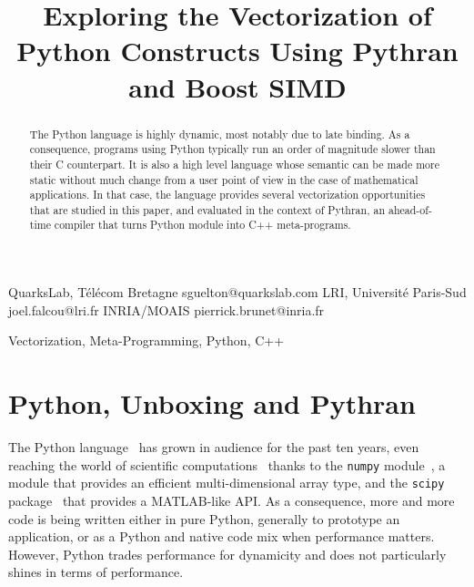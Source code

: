 \documentclass[preprint]{sigplanconf}
\begin{document}
\setlength{\pdfpageheight}{\paperheight}
\setlength{\pdfpagewidth}{\paperwidth}


\title{Exploring the Vectorization of Python Constructs Using Pythran and Boost SIMD}

           {QuarksLab, T{\'e}l{\'e}com Bretagne}
           {sguelton@quarkslab.com}
           {LRI, Universit\'e Paris-Sud}
           {joel.falcou@lri.fr}
           {INRIA/MOAIS}
           {pierrick.brunet@inria.fr}

\maketitle

\begin{abstract}

    The Python language is highly dynamic, most notably due to late binding. As
    a consequence, programs using Python typically run an order of magnitude
    slower than their C counterpart. It is also a high level language whose
    semantic can be made more static without much change from a user point of
    view in the case of mathematical applications. In that case, the language
    provides several vectorization opportunities that are studied in this
    paper, and evaluated in the context of Pythran, an ahead-of-time compiler
    that turns Python module into C++ meta-programs.

\end{abstract}



\keywords
Vectorization, Meta-Programming, Python, C++


\section{Python, Unboxing and Pythran}

The Python language~\cite{rossum97} has grown in audience for the past ten
years, even reaching the world of scientific computations~\cite{oliphant2007}
thanks to the \texttt{numpy} module~\cite{numpyarray2011}, a module that
provides an efficient multi-dimensional array type, and the \texttt{scipy}
package~\cite{scipy} that provides a MATLAB-like API. As a consequence, more
and more code is being written either in pure Python, generally to prototype an
application, or as a Python and native code mix when performance matters.
However, Python trades performance for dynamicity and does not particularly
shines in terms of performance.
\end{document}
